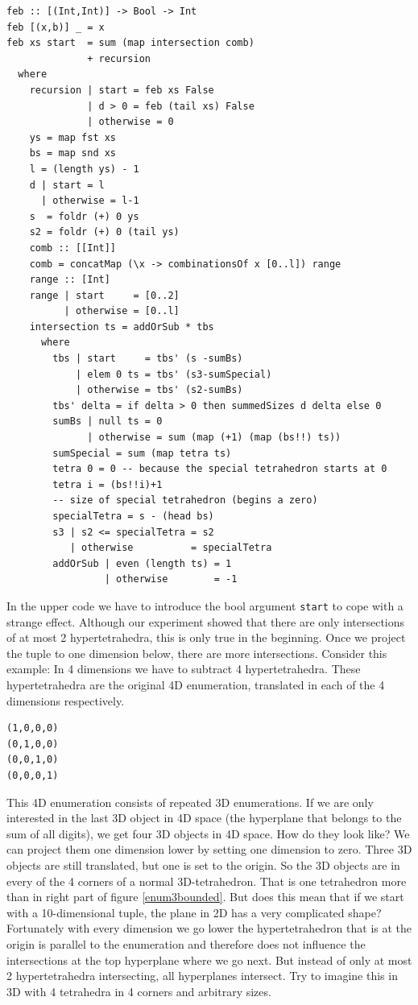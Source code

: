 \documentclass{tmr}
\begin{document}
\begin{Verbatim}
feb :: [(Int,Int)] -> Bool -> Int
feb [(x,b)] _ = x
feb xs start  = sum (map intersection comb)
              + recursion
  where
    recursion | start = feb xs False
              | d > 0 = feb (tail xs) False
              | otherwise = 0
    ys = map fst xs
    bs = map snd xs
    l = (length ys) - 1
    d | start = l
      | otherwise = l-1
    s  = foldr (+) 0 ys
    s2 = foldr (+) 0 (tail ys)
    comb :: [[Int]]
    comb = concatMap (\x -> combinationsOf x [0..l]) range
    range :: [Int]
    range | start     = [0..2]
          | otherwise = [0..l]
    intersection ts = addOrSub * tbs
      where
        tbs | start     = tbs' (s -sumBs)
            | elem 0 ts = tbs' (s3-sumSpecial)
            | otherwise = tbs' (s2-sumBs)
        tbs' delta = if delta > 0 then summedSizes d delta else 0
        sumBs | null ts = 0
              | otherwise = sum (map (+1) (map (bs!!) ts))
        sumSpecial = sum (map tetra ts)
        tetra 0 = 0 -- because the special tetrahedron starts at 0
        tetra i = (bs!!i)+1
        -- size of special tetrahedron (begins a zero)
        specialTetra = s - (head bs)
        s3 | s2 <= specialTetra = s2
           | otherwise          = specialTetra
        addOrSub | even (length ts) = 1
                 | otherwise        = -1
\end{Verbatim}

In the upper code we have to introduce the bool argument \verb|start| to cope with a strange effect.
Although our experiment showed that there are only intersections of at most 2 hypertetrahedra,
this is only true in the beginning. Once we project the tuple to one dimension below,
there are more intersections.
Consider this example: In 4 dimensions we have to subtract 4 hypertetrahedra.
These hypertetrahedra are the original 4D enumeration, translated in each of the
4 dimensions respectively. \eg
\begin{Verbatim}
(1,0,0,0)
(0,1,0,0)
(0,0,1,0)
(0,0,0,1)
\end{Verbatim}

This 4D enumeration consists of repeated 3D enumerations.
If we are only interested in the last 3D object in 4D space (the hyperplane that belongs 
to the sum of all digits), we get four 3D objects in 4D space. How do they look like? 
We can project them one dimension lower by setting one dimension to zero.
Three 3D objects are still translated, but one is set to the origin.
So the 3D objects are in every of the 4 corners of a normal 3D-tetrahedron.
That is one tetrahedron more than in right part of figure \ref{enum3bounded}.
But does this mean that if we start with a 10-dimensional tuple, the plane in 2D has a
very complicated shape? Fortunately with every dimension we go lower the hypertetrahedron 
that is at the origin is parallel to the enumeration and therefore does not influence 
the intersections at the top hyperplane where we go next. But instead of only at most 2 
hypertetrahedra intersecting, all hyperplanes intersect. Try to imagine this in 3D with 4 
tetrahedra in 4 corners and arbitrary sizes.
\end{document}
